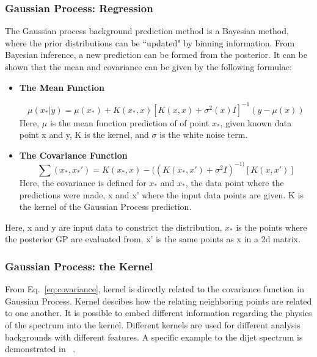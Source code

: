 \subsubsection{Gaussian Process: Regression}

The Gaussian process background prediction method is a Bayesian method, where the prior distributions can be ``updated" by binning information. From Bayesian inference, a new prediction can be formed from the posterior. It can be shown that the mean and covariance can be given by the following formulae:

    \begin{itemize}

        \item \textbf{The Mean Function}

    \begin{equation}
        \mu(x_{*}|y)  = \mu(x_{*})+ K(x_{*}, x)[K(x, x)+ \sigma^{2}(x)I]^{-1}(y-\mu(x))
    \end{equation}
    Here, $\mu$ is the mean function prediction of of point $x_{*}$, given known data point x and y, K is the kernel, and $\sigma$ is the white noise term.

    \item \textbf{The Covariance Function}
    \begin{equation}
        \sum(x_{*}, x_{*}') = K(x_{*}, x) - ((K(x_{*}, x')+\sigma^{2}I)^{-1)}[K(x, x')]
    \label{eq:covariance}
    \end{equation}  
    Here, the covariance is defined for $x_{*}$ and $x_{*}$, the data point where the predictions were made, x and x' where the input data points are given. K is the kernel of the Gaussian Process prediction.

    \end{itemize}

    Here, x and y are input data to constrict the distribution, $x_{*}$ is the points where the posterior GP are evaluated from, x' is the same points as x in a 2d matrix.

    \subsubsection{Gaussian Process: the Kernel}
\label{sec:kernel}
From Eq.~\ref{eq:covariance}, kernel is directly related to the covariance function in Gaussian Process. Kernel descibes how the relating neighboring points are related to one another. It is possible to embed different information regarding the physics of the spectrum into the kernel. 
Different kernels are used for different analysis backgrounds with different features. A specific example to the dijet spectrum is demonstrated in ~\cite{frate2017modeling}.

